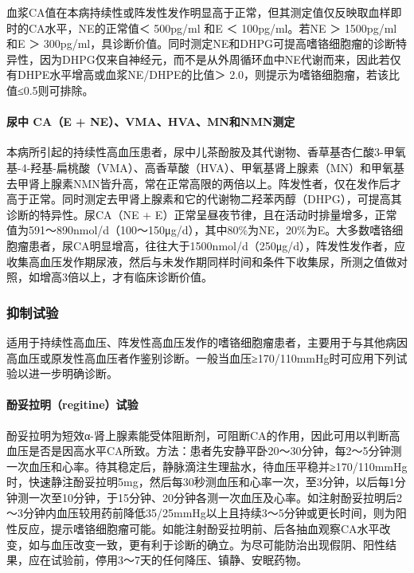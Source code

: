 血浆CA值在本病持续性或阵发性发作明显高于正常，但其测定值仅反映取血样即时的CA水平，NE的正常值＜
500pg/ml 和E ＜ 100pg/ml。若NE ＞ 1500pg/ml和E ＞
300pg/ml，具诊断价值。同时测定NE和DHPG可提高嗜铬细胞瘤的诊断特异性，因为DHPG仅来自神经元，而不是从外周循环血中NE代谢而来，因此若仅有DHPE水平增高或血浆NE/DHPE的比值＞
2.0，则提示为嗜铬细胞瘤，若该比值≤0.5则可排除。

\paragraph{尿中 CA（E + NE）、VMA、HVA、MN和NMN测定}

本病所引起的持续性高血压患者，尿中儿茶酚胺及其代谢物、香草基杏仁酸3-甲氧基-4-羟基-扁桃酸（VMA）、高香草酸（HVA）、甲氧基肾上腺素（MN）和甲氧基去甲肾上腺素NMN皆升高，常在正常高限的两倍以上。阵发性者，仅在发作后才高于正常。同时测定去甲肾上腺素和它的代谢物二羟苯丙醇（DHPG），可提高其诊断的特异性。尿CA（NE
+
E）正常呈昼夜节律，且在活动时排量增多，正常值为591～890nmol/d（100～150μg/d），其中80\%为NE，20\%为E。大多数嗜铬细胞瘤患者，尿CA明显增高，往往大于1500nmol/d（250μg/d），阵发性发作者，应收集高血压发作期尿液，然后与未发作期同样时间和条件下收集尿，所测之值做对照，如增高3倍以上，才有临床诊断价值。

\subsubsection{抑制试验}

适用于持续性高血压、阵发性高血压发作的嗜铬细胞瘤患者，主要用于与其他病因高血压或原发性高血压者作鉴别诊断。一般当血压≥170/110mmHg时可应用下列试验以进一步明确诊断。

\paragraph{酚妥拉明（regitine）试验}

酚妥拉明为短效α-肾上腺素能受体阻断剂，可阻断CA的作用，因此可用以判断高血压是否是因高水平CA所致。方法：患者先安静平卧20～30分钟，每2～5分钟测一次血压和心率。待其稳定后，静脉滴注生理盐水，待血压平稳并≥170/110mmHg时，快速静注酚妥拉明5mg，然后每30秒测血压和心率一次，至3分钟，以后每1分钟测一次至10分钟，于15分钟、20分钟各测一次血压及心率。如注射酚妥拉明后2～3分钟内血压较用药前降低35/25mmHg以上且持续3～5分钟或更长时间，则为阳性反应，提示嗜铬细胞瘤可能。如能注射酚妥拉明前、后各抽血观察CA水平改变，如与血压改变一致，更有利于诊断的确立。为尽可能防治出现假阴、阳性结果，应在试验前，停用3～7天的任何降压、镇静、安眠药物。

